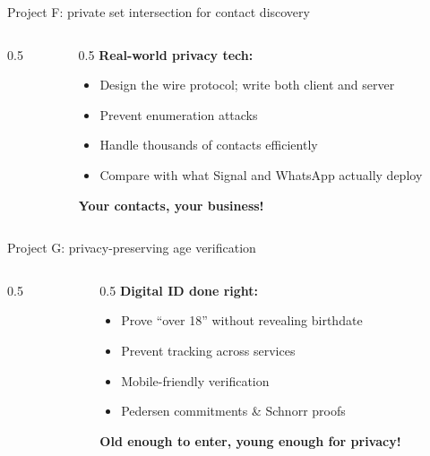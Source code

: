 \ifdefined\PRESENTATION\else\PassOptionsToClass{handout}{beamer}\fi\documentclass[aspectratio=169, lualatex]{beamer}
\begin{document}
\begin{frame}{Project F: private set intersection for contact discovery}
	\begin{columns}[c]
		\begin{column}{0.5\textwidth}
		\end{column}
		\begin{column}{0.5\textwidth}
			\textbf{Real-world privacy tech:}
			\begin{itemize}[<+->]
				\item Design the wire protocol; write both client and server
				\item Prevent enumeration attacks
				\item Handle thousands of contacts efficiently
				\item Compare with what Signal and WhatsApp actually deploy
			\end{itemize}
			\vspace{0.5cm}
			\textcolor{cipherprimary}{\textbf{Your contacts, your business!}}
		\end{column}
	\end{columns}
\end{frame}

\begin{frame}{Project G: privacy-preserving age verification}
	\begin{columns}[c]
		\begin{column}{0.5\textwidth}
		\end{column}
		\begin{column}{0.5\textwidth}
			\textbf{Digital ID done right:}
			\begin{itemize}[<+->]
				\item Prove ``over 18'' without revealing birthdate
				\item Prevent tracking across services
				\item Mobile-friendly verification
				\item Pedersen commitments \& Schnorr proofs
			\end{itemize}
			\vspace{0.5cm}
			\textcolor{cipherprimary}{\textbf{Old enough to enter, young enough for privacy!}}
		\end{column}
	\end{columns}
\end{frame}
\end{document}
